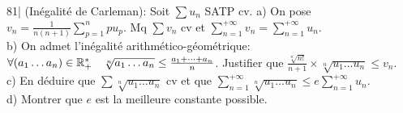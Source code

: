 
\begin{statementbox}
81| (Inégalité de Carleman): Soit $\sum u_n$ SATP cv.
a) On pose $v_n = \frac{1}{n(n+1)} \sum_{p=1}^n p u_p$. Mq $\sum v_n$ cv et $\sum_{n=1}^{+\infty} v_n = \sum_{n=1}^{+\infty} u_n$. \\
b) On admet l'inégalité arithmético-géométrique: $\forall (a_1 \dots a_n) \in \mathbb R_+^* \quad \sqrt[n]{a_1 \dots a_n} \leq \frac{a_1 + \dots + a_n}{n}$. Justifier que $\frac{\sqrt[n]{n!}}{n+1} \times \sqrt[n]{u_1 \dots u_n} \leq v_n$. \\
c) En déduire que $\sum \sqrt[n]{u_1 \dots u_n}$ cv et que $\sum_{n=1}^{+\infty} \sqrt[n]{u_1 \dots u_n} \leq e \sum_{n=1}^{+\infty} u_n$. \\
d) Montrer que $e$ est la meilleure constante possible.
\end{statementbox}

